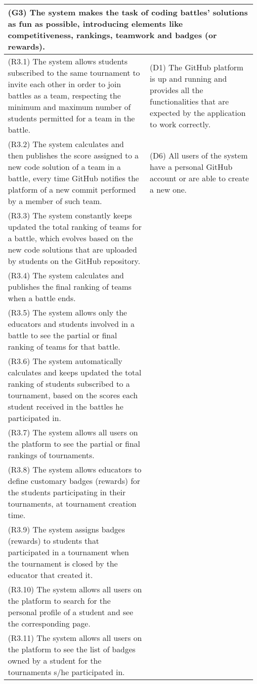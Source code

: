 \begin{longtable}{|p{8cm}|p{8cm}|}
\hline
\multicolumn{2}{|p{16cm}|}{\textbf{(G3) The system makes the task of coding battles' solutions as fun as possible, introducing elements like competitiveness, rankings, teamwork and badges (or rewards).}}\\
\hline
(R3.1) The system allows students subscribed to the same tournament to invite each other in order to join battles as a team, respecting the minimum and maximum number of students permitted for a team in the battle. & (D1) The GitHub platform is up and running and provides all the functionalities that are expected by the application to work correctly. \\
(R3.2) The system calculates and then publishes the score assigned to a new code solution of a team in a battle, every time GitHub notifies the platform of a new commit performed by a member of such team. & (D6) All users of the system have a personal GitHub account or are able to create a new one. \\
(R3.3) The system constantly keeps updated the total ranking of teams for a battle, which evolves based on the new code solutions that are uploaded by students on the GitHub repository. & \\
(R3.4) The system calculates and publishes the final ranking of teams when a battle ends. & \\
(R3.5) The system allows only the educators and students involved in a battle to see the partial or final ranking of teams for that battle. & \\
(R3.6) The system automatically calculates and keeps updated the total ranking of students subscribed to a tournament, based on the scores each student received in the battles he participated in. & \\
(R3.7) The system allows all users on the platform to see the partial or final rankings of tournaments. & \\
(R3.8)  The system allows educators to define customary badges (rewards) for the students participating in their tournaments, at tournament creation time. & \\
(R3.9) The system assigns badges (rewards) to students that participated in a tournament when the tournament is closed by the educator that created it. & \\
(R3.10) The system allows all users on the platform to search for the personal profile of a student and see the corresponding page. & \\
(R3.11) The system allows all users on the platform to see the list of badges owned by a student for the tournaments s/he participated in. & \\
\hline
\end{longtable}